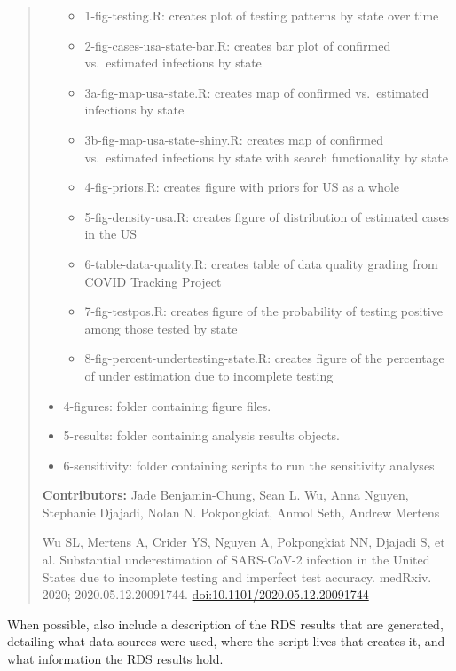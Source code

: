 \documentclass[]{book}
\begin{document}
\begin{quote}
\begin{itemize}
  \begin{itemize}
  \item
    1-fig-testing.R: creates plot of testing patterns by state over time
  \item
    2-fig-cases-usa-state-bar.R: creates bar plot of confirmed
    vs.~estimated infections by state
  \item
    3a-fig-map-usa-state.R: creates map of confirmed vs.~estimated
    infections by state
  \item
    3b-fig-map-usa-state-shiny.R: creates map of confirmed vs.~estimated
    infections by state with search functionality by state
  \item
    4-fig-priors.R: creates figure with priors for US as a whole
  \item
    5-fig-density-usa.R: creates figure of distribution of estimated
    cases in the US
  \item
    6-table-data-quality.R: creates table of data quality grading from
    COVID Tracking Project
  \item
    7-fig-testpos.R: creates figure of the probability of testing
    positive among those tested by state
  \item
    8-fig-percent-undertesting-state.R: creates figure of the percentage
    of under estimation due to incomplete testing
  \end{itemize}
\item
  4-figures: folder containing figure files.
\item
  5-results: folder containing analysis results objects.
\item
  6-sensitivity: folder containing scripts to run the sensitivity
  analyses
\end{itemize}

\textbf{Contributors:} Jade Benjamin-Chung, Sean L. Wu, Anna Nguyen,
Stephanie Djajadi, Nolan N. Pokpongkiat, Anmol Seth, Andrew Mertens

Wu SL, Mertens A, Crider YS, Nguyen A, Pokpongkiat NN, Djajadi S, et al.
Substantial underestimation of SARS-CoV-2 infection in the United States
due to incomplete testing and imperfect test accuracy. medRxiv. 2020;
2020.05.12.20091744. \url{doi:10.1101/2020.05.12.20091744}
\end{quote}

When possible, also include a description of the RDS results that are
generated, detailing what data sources were used, where the script lives
that creates it, and what information the RDS results hold.
\end{document}
